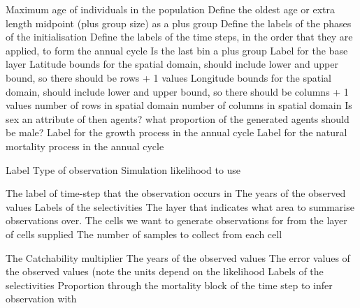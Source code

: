  {Maximum age of individuals in the population}
 {Define the oldest age or extra length midpoint (plus group size) as a plus group}
 {Define the labels of the phases of the initialisation}
 {Define the labels of the time steps, in the order that they are applied, to form the annual cycle}
 {}
 {Is the last bin a plus group}
 {Label for the base layer}
 {Latitude bounds for the spatial domain, should include lower and upper bound, so there should be rows + 1 values}
 {Longitude bounds for the spatial domain, should include lower and upper bound, so there should be columns + 1 values}
 {number of rows in spatial domain}
 {number of columns in spatial domain}
 {Is sex an attribute of then agents?}
 {what proportion of the generated agents should be male?}
 {Label for the growth process in the annual cycle}
 {Label for the natural mortality process in the annual cycle}
 {}
\par\par
{} {Label}
 {Type of observation}
 {Simulation likelihood to use}
\par\textbf{}\par
{} {The label of time-step that the observation occurs in}
 {The years of the observed values}
 {Labels of the selectivities}
 {The layer that indicates what area to summarise observations over.}
 {The cells we want to generate observations for from the layer of cells supplied}
 {The number of samples to collect from each cell}
\par\textbf{}\par
{} {The Catchability multiplier}
 {The years of the observed values}
 {The error values of the observed values (note the units depend on the likelihood}
 {Labels of the selectivities}
 {Proportion through the mortality block of the time step to infer observation with}
